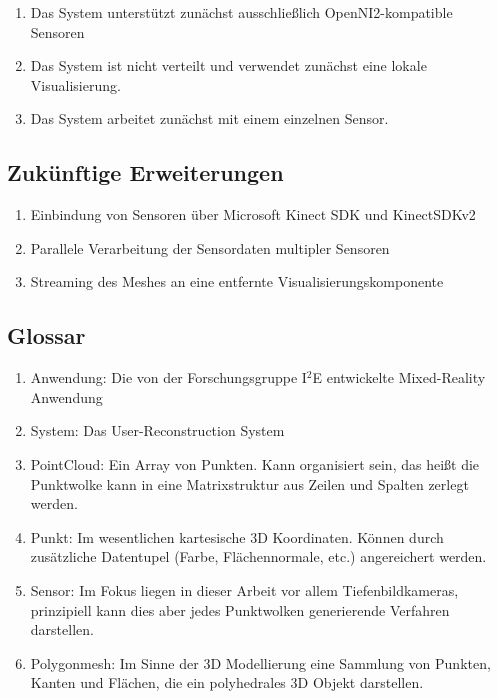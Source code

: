 \begin{enumerate}
	\item Das System unterstützt zunächst ausschließlich OpenNI2-kompatible Sensoren
	\item Das System ist nicht verteilt und verwendet zunächst eine lokale Visualisierung.
	\item Das System arbeitet zunächst mit einem einzelnen Sensor.
\end{enumerate}

\subsection{Zukünftige Erweiterungen}

\begin{enumerate}
	\item Einbindung von Sensoren über Microsoft Kinect SDK und KinectSDKv2
	\item Parallele Verarbeitung der Sensordaten multipler Sensoren
	\item Streaming des Meshes an eine entfernte Visualisierungskomponente 
\end{enumerate}

\subsection{Glossar}

\begin{enumerate}
	\item Anwendung: Die von der Forschungsgruppe I$^2$E entwickelte Mixed-Reality Anwendung
	\item System: Das User-Reconstruction System
	\item PointCloud: Ein Array von Punkten. Kann organisiert sein, das heißt die Punktwolke kann in eine Matrixstruktur aus Zeilen und Spalten zerlegt werden.
	\item Punkt: Im wesentlichen kartesische 3D Koordinaten. Können durch zusätzliche Datentupel (Farbe, Flächennormale, etc.) angereichert werden.
	\item Sensor: Im Fokus liegen in dieser Arbeit vor allem Tiefenbildkameras, prinzipiell kann dies aber jedes Punktwolken generierende Verfahren darstellen.
	\item Polygonmesh: Im Sinne der 3D Modellierung eine Sammlung von Punkten, Kanten und Flächen, die ein polyhedrales 3D Objekt darstellen.
\end{enumerate}

